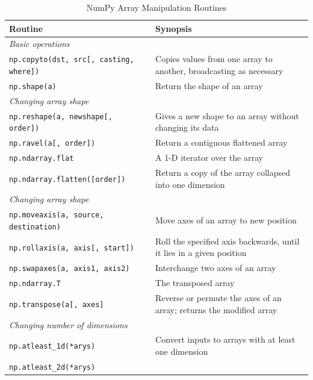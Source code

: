 \documentclass[a4paper,11pt]{book}
\begin{document}
\begin{appendices}
\begin{table}
	\centering
	\caption{NumPy Array Manipulation Routines}
	\label{tab:numpy_array_manipulation}
	\begin{tabular}{lp{13cm}}
		\toprule \toprule
		Routine & Synopsis \\ \midrule
		\multicolumn{1}{l}{\textit{Basic operations}} \\ 
		\midrule
		\texttt{np.copyto(dst, src[, casting, where])} &
                Copies values from one array to another, broadcasting as necessary\\
                \texttt{np.shape(a)} &
                Return the shape of an array\\
		\midrule
		\multicolumn{1}{l}{\textit{Changing array shape}} \\ 
		\midrule
  		\texttt{np.reshape(a, newshape[, order])}&
                Gives a new shape to an array without changing its data\\
   	        \texttt{np.ravel(a[, order])} &
                Return a contiguous flattened array\\
                \texttt{np.ndarray.flat}&
                A 1-D iterator over the array\\
                \texttt{np.ndarray.flatten([order])}&
		Return a copy of the array collapsed into one dimension\\
		\midrule
		\multicolumn{1}{l}{\textit{Changing array shape}} \\ 
	        \texttt{np.moveaxis(a, source, destination)}&
                Move axes of an array to new position\\
                \texttt{np.rollaxis(a, axis[, start])}&
                Roll the specified axis backwards, until it lies in a given position\\
                \texttt{np.swapaxes(a, axis1, axis2)}&
                Interchange two axes of an array\\
                \texttt{np.ndarray.T}&
                The transposed array\\
                \texttt{np.transpose(a[, axes]}&
                Reverse or permute the axes of an array; returns the modified array\\
		\midrule
		\multicolumn{1}{l}{\textit{Changing number of dimensions}} \\ 
		\midrule
                \texttt{np.atleast\_1d(*arys)}&
                Convert inputs to arrays with at least one dimension\\
                \texttt{np.atleast\_2d(*arys)}&

\end{tabular}
\end{table}
\end{appendices}
\end{document}
